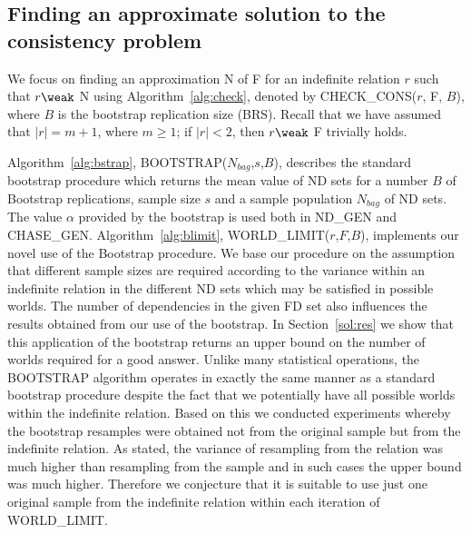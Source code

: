 \subsection{Finding an approximate solution to the consistency problem}
\label{sec:consist_approx}

We focus on finding an approximation N of F for an indefinite relation
$r$ such that $r \weak$ N
using Algorithm~\ref{alg:check}, denoted by CHECK\_CONS($r$, F, $B$),
where $B$ is the bootstrap replication size (BRS).
Recall that we have assumed that $\mid r \mid = m+1$, where $m \ge 1$;
if $\mid r \mid < 2$, then $r \weak$ F trivially holds. 

\medskip

 Algorithm~\ref{alg:bstrap}, BOOTSTRAP($N_{bag}$,$s$,$B$),
describes the standard bootstrap procedure which returns the mean value
of ND sets for a number $B$ of Bootstrap replications, sample size $s$ and a
sample population $N_{bag}$ of ND sets. The value $\alpha$
provided by the bootstrap is used both in ND\_GEN and CHASE\_GEN.
 Algorithm~\ref{alg:blimit}, WORLD\_LIMIT($r$,$F$,$B$), implements our novel use 
of the Bootstrap procedure. We
base our procedure on the assumption that different sample sizes are
required according to the variance within an indefinite relation in
the different ND sets which may be satisfied in possible
worlds. The number of dependencies in the given FD set also influences
the results obtained from our use of the bootstrap. In Section~\ref{sol:res}
we show that this application of the bootstrap returns an upper bound on 
the number of worlds required for a good answer. Unlike many statistical
operations, the BOOTSTRAP
algorithm operates in exactly the same manner as a standard bootstrap
procedure despite the fact that we potentially have all possible worlds
within the indefinite relation.  Based on this we conducted experiments
whereby the bootstrap resamples were obtained not from the original
sample but from the indefinite relation. As stated, the variance of resampling
from the relation
was much higher than resampling from the sample and in such cases the upper bound was 
much higher.
Therefore we conjecture that it is suitable to use just one original sample
from the indefinite relation within each iteration of WORLD\_LIMIT.


